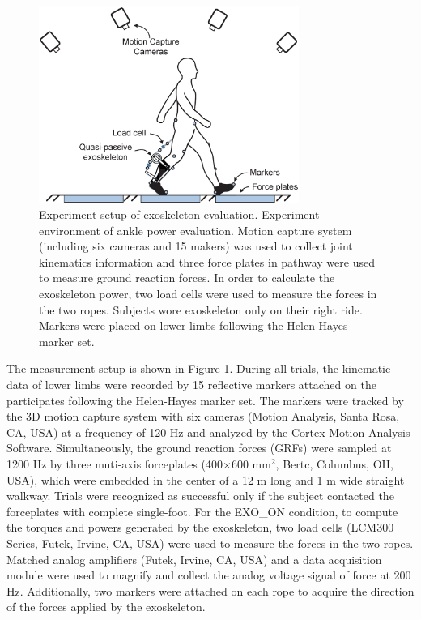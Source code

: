 \documentclass[twocolumn,cleanfoot,10pt]{asme2ej}
\begin{document}
\begin{figure}[bt]
	\centering
	\includegraphics[width=8.5cm]{environment.eps}
	\caption{Experiment setup of exoskeleton evaluation. Experiment environment of ankle power evaluation. Motion capture system (including six  cameras and 15 makers) was used to collect joint kinematics information and three force plates in pathway were used to measure ground reaction forces. In order to calculate the exoskeleton power, two load cells were used to measure the forces in the two ropes. Subjects wore exoskeleton only on their right ride. Markers were placed on lower limbs following the Helen Hayes marker set.}
	\label{fig:Environment}
\end{figure}

The measurement setup is shown in Figure \ref{fig:Environment}. During all trials, the kinematic data of lower limbs were recorded by 15 reflective markers attached on the participates following the Helen-Hayes marker set\cite{RN24}. The markers were tracked by the 3D motion capture system with six cameras (Motion Analysis, Santa Rosa, CA, USA) at a frequency of 120 Hz and analyzed by the Cortex Motion Analysis Software. Simultaneously, the ground reaction forces (GRFs) were sampled at 1200 Hz by three muti-axis forceplates (400$\times$600 mm$^{2}$, Bertc, Columbus, OH, USA), which were embedded in the center of a 12 m long and 1 m wide straight walkway. Trials were recognized as successful only if the subject contacted the forceplates with complete single-foot. For the EXO\_ON condition, to compute the torques and powers generated by the exoskeleton, two load cells (LCM300 Series, Futek, Irvine, CA, USA) were used to measure the forces in the two ropes. Matched analog amplifiers (Futek, Irvine, CA, USA) and a data acquisition module were used to magnify and collect the analog voltage signal of force at 200 Hz. Additionally, two markers were attached on each rope to acquire the direction of the forces applied by the exoskeleton.
\end{document}
